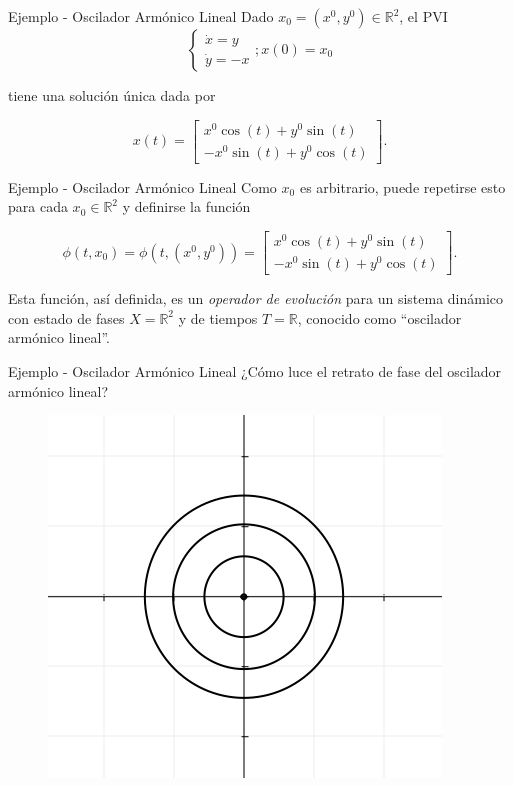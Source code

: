 \documentclass{beamer}
\newcommand{\R}{{\ensuremath{\mathbb{R}}}}
\begin{document}
\begin{frame}{Ejemplo - Oscilador Armónico Lineal}
Dado $x_0 = (x^0,y^0) \in \R^2$, el PVI
$$
\left\{ \begin{array}{l}
	\dot{x} =  y \\
	\dot{y} = -x
\end{array} \right.; x(0) = x_0
$$

tiene una solución única dada por

$$
x(t) = \left[ \begin{array}{l}
		 x^0 \cos(t) + y^0 \sin(t) \\
		-x^0 \sin(t) + y^0 \cos(t)
	\end{array} \right].
$$
\end{frame}

\begin{frame}{Ejemplo - Oscilador Armónico Lineal}
Como $x_0$ es arbitrario, puede repetirse esto para cada $x_0 \in \R^2$ y definirse la función

$$ \phi(t,x_0) = \phi(t, (x^0, y^0) ) = \left[{
	\begin{array}{l}
		x^0 \cos(t) + y^0 \sin(t) \\
		-x^0 \sin(t) + y^0 \cos(t)
	\end{array}} \right].
$$

Esta función, así definida, es un \emph{operador de evolución} para un sistema dinámico con estado de fases $X = \R^2$ y de tiempos $T = \R$, conocido como ``oscilador armónico lineal''.
\end{frame}

\begin{frame}{Ejemplo - Oscilador Armónico Lineal}
¿Cómo luce el retrato de fase del oscilador armónico lineal?
\pause
\begin{figure}[h] \centering
    \includegraphics[scale=0.5]{../figures/osciladorarmonico-diagramafase.png}
\end{figure}
\end{frame}
\end{document}
